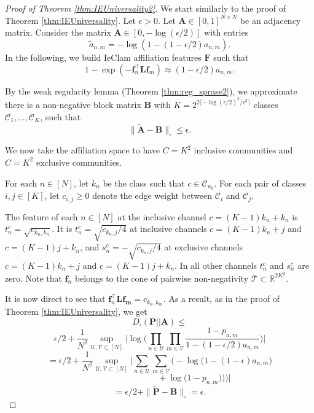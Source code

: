 \documentclass[letterpaper]{article} %
\begin{document}
\begin{proof}[Proof of Theorem \ref{thm:IEUniversality2}]

We start similarly to the proof of Theorem \ref{thm:IEUniversality}. Let $\epsilon>0$. Let $\mathbf{A}\in[0,1]^{N\times N}$ be an adjacency matrix. 
Consider the matrix  $\tilde{\mathbf{A}}\in[0,-\log(\epsilon/2)]$ with entries
\[\tilde{a}_{n,m}=-\log(1-(1-\epsilon/2)a_{n,m}).\]
In the following, we build IeClam affiliation features $\mathbf{F}$  such that
\[1-\exp(-\mathbf{f}_n^{\top}\mathbf{L}\mathbf{f}_m)\approx (1-\epsilon/2)a_{n,m}.\]

By the weak regularity lemma (Theorem \ref{thm:reg_sprase2}), we approximate there is a non-negative block matrix $\mathbf{B}$ with $K=2^{2\lceil -\log(\epsilon/2)^2/\epsilon^2\rceil}$ classes $\mathcal{C}_1,\ldots,\mathcal{C}_K$, such that
\[\|\tilde{\mathbf{A}}-\mathbf{B}\|_{\square} \leq \epsilon.\]

We now take the affiliation space to have $C=K^2$ inclusive communities  and $C=K^2$ exclusive communities.

For each $n\in[N]$, let $k_n$ be the class such that $c\in\mathcal{C}_{n_k}$.  For each pair of classes $i,j\in[K]$, let $c_{i,j}\geq 0$ denote the edge weight between $\mathcal{C}_i$ and $\mathcal{C}_j$.



The feature of each $n\in[N]$ at the inclusive channel $c=(K-1)k_n+k_n$ is $t_n^c=\sqrt{c_{k_n,k_n}}$. It is $t_n^c=\sqrt{c_{k_n,j}/4}$ at inclusive channels $c=(K-1)k_n+j$ and $c=(K-1)j+k_n$, and $s_n^c=-\sqrt{c_{k_n,j}/4}$ at exclusive channels $c=(K-1)k_n+j$ and $c=(K-1)j+k_n$. In all other channels $t^c_n$ and $s^c_n$ are zero. Note that $\mathbf{f}_n$ belongs to the cone of pairwise non-negativity $\mathcal{T}\subset \mathbb{R}^{2K^2}$.

It is now direct to see that  $\mathbf{f}_n^\top\mathbf{L}\mathbf{f_m}=c_{k_n,k_m}$.  As a result, as in the proof of Theorem \ref{thm:IEUniversality}, we get
\[D_{\square}(\mathbf{P}||\mathbf{A}) \leq \]
\[\epsilon/2+\frac{1}{N^2}\sup_{\mathcal{U},\mathcal{V}\subset[N]}\Big|\log\Big(\prod_{n\in \mathcal{U}}\prod_{m\in \mathcal{V}}
\frac{1-p_{n,m}}{1-(1-\epsilon/2)a_{n,m}}\Big)\Big|\]
\[ =
\epsilon/2+\frac{1}{N^2}\sup_{\mathcal{U},\mathcal{V}\subset[N]}\Big|\sum_{n\in \mathcal{U}}\sum_{m\in \mathcal{V}}\Big(-\log\big(1-(1-\epsilon)a_{n,m}\big) \]
\[\quad \quad \quad \quad\quad \quad \quad \quad + \log\big(1-p_{n,m})\big)\Big)\Big|\]
\[=\epsilon/2 + \| \tilde{\mathbf{P}}-\mathbf{B} \|_{\square} = \epsilon. \]



\end{proof}
\end{document}

